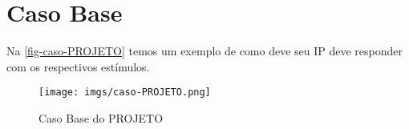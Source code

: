 \documentclass[
    12pt,
    a4paper,
    oneside,
    chapter=TITLE,
    section=TITLE,
    subsection=TITLE,
    subsubsection=TITLE,
    english,
    french,
    spanish,
    brazil,
    ]{abntex2}
\begin{document}
\section{Caso Base}
Na \autoref{fig-caso-PROJETO} temos um exemplo de como deve seu IP deve responder com os respectivos estímulos.

\begin{figure}[htb]
    \caption{\label{fig-caso-PROJETO}Caso Base do PROJETO}
    \begin{center}
        \advance\leftskip-3cm
        \texttt{[image: imgs/caso-PROJETO.png]}
    \end{center}
\end{figure}
\end{document}
